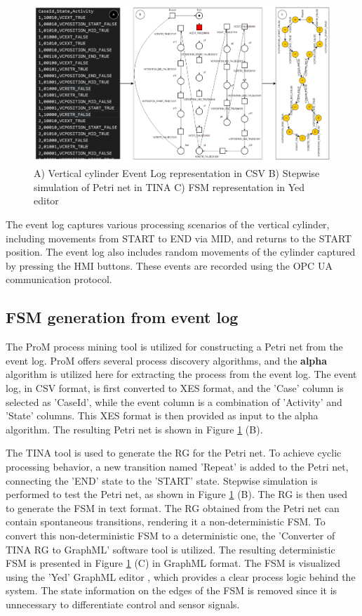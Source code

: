 \begin{bibunit}
\begin{figure}[!t]
	\centering
	\includegraphics[width=1\textwidth]{MX_Papers/Paper7/images/EL2FSM.png}
	\caption{A) Vertical cylinder Event Log representation in CSV B) Stepwise simulation of Petri net in TINA C) FSM representation in Yed editor}
	\label{EL2FSM}
\end{figure}


The event log captures various processing scenarios of the vertical cylinder, including movements from START to END via  MID,
  and returns to the START position. The event log also includes random movements of the cylinder captured by pressing the HMI buttons. These events are recorded using the OPC UA communication protocol.


\subsection{ FSM generation from event log}

The ProM process mining tool is utilized for constructing a Petri net from the event log. ProM offers several process discovery algorithms, and the \textbf{alpha} algorithm is utilized here for extracting the process from the event log. The event log, in CSV format, is first converted to XES format, and the 'Case' column is selected as 'CaseId', while the event column is a combination of 'Activity' and 'State' columns. This XES format is then provided as input to the alpha algorithm. The resulting Petri net is shown in Figure \ref{EL2FSM} (B).


The TINA tool is used to generate the RG for the Petri net. To achieve cyclic processing behavior, a new transition named 'Repeat' is added to the Petri net, connecting the 'END' state to the 'START' state. Stepwise simulation is performed to test the Petri net, as shown in Figure \ref{EL2FSM} (B). The RG is then used to generate the FSM in text format. The RG obtained from the Petri net can contain spontaneous transitions, rendering it a non-deterministic FSM. To convert this non-deterministic FSM to a deterministic one, the 'Converter of TINA RG to GraphML' software tool \cite{xavier2022interactive} is utilized. The resulting deterministic FSM is presented in Figure \ref{EL2FSM} (C) in GraphML format. The FSM is visualized using the 'Yed' GraphML editor \cite{yworks}, which provides a clear process logic behind the system. The state information on the edges of the FSM is removed since it is unnecessary to differentiate control and sensor signals.




\end{bibunit}
